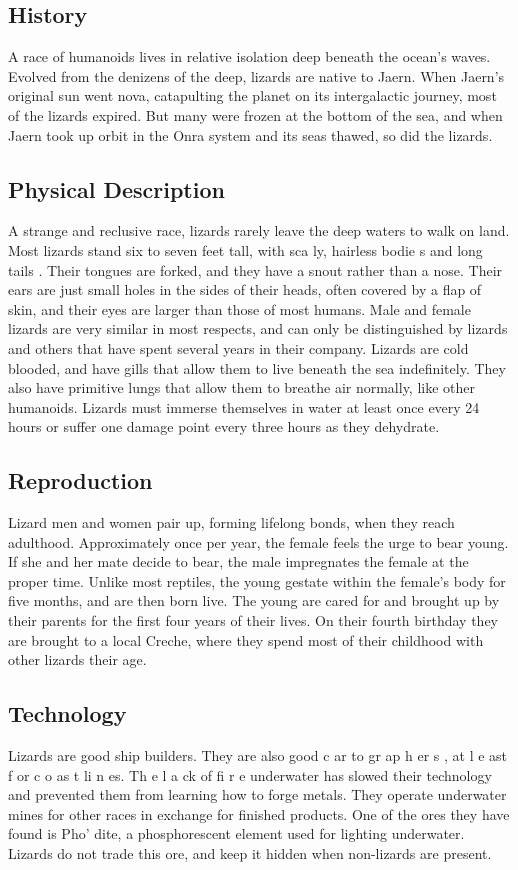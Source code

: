 \begin{multicols*}{2}
\subsection{History}
A race of humanoids lives in relative isolation deep
beneath the ocean’s waves. Evolved from the denizens of the
deep, lizards are native to Jaern. When Jaern’s original sun
went nova, catapulting the planet on its intergalactic journey,
most of the lizards expired. But many were frozen at the
bottom of the sea, and when Jaern took up orbit in the Onra
system and its seas thawed, so did the lizards.
\subsection{Physical Description}
A strange and reclusive race, lizards rarely leave the
deep waters to walk on land. Most lizards stand six to seven
feet tall, with sca ly, hairless bodie s and long tails . Their
tongues are forked, and they have a snout rather than a nose.
Their ears are just small holes in the sides of their heads,
often covered by a flap of skin, and their eyes are larger than
those of most humans.
Male and female lizards are very similar in most
respects, and can only be distinguished by lizards and others
that have spent several years in their company. Lizards are
cold blooded, and have gills that allow them to live beneath
the sea indefinitely. They also have primitive lungs that allow
them to breathe air normally, like other humanoids.
Lizards must immerse themselves in water at least
once every 24 hours or suffer one damage point every three
hours as they dehydrate.
\subsection{Reproduction}
Lizard men and women pair up, forming lifelong
bonds, when they reach adulthood. Approximately once per
year, the female feels the urge to bear young. If she and her
mate decide to bear, the male impregnates the female at the
proper time. Unlike most reptiles, the young gestate within
the female’s body for five months, and are then born live.
The young are cared for and brought up by their
parents for the first four years of their lives. On their fourth
birthday they are brought to a local Creche, where they spend
most of their childhood with other lizards their age.
\subsection{Technology}
Lizards are good ship builders. They are also good
c ar to gr ap h er s , at l e ast f or c o as t li n es. Th e l a ck of fi r e
underwater has slowed their technology and prevented them
from learning how to forge metals. They operate underwater
mines for other races in exchange for finished products. One
of the ores they have found is Pho’ dite, a phosphorescent
element used for lighting underwater. Lizards do not trade
this ore, and keep it hidden when non-lizards are present.

\end{multicols*}
